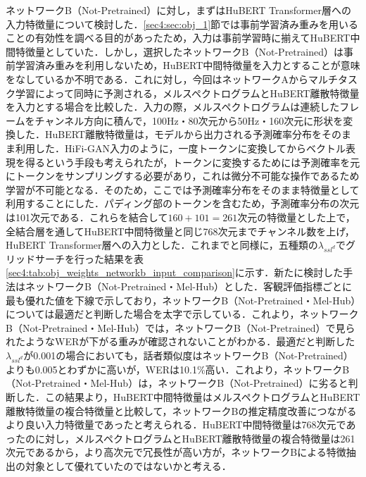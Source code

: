 \documentclass[12pt]{jarticle}
\numberwithin{equation}{section}    %
\numberwithin{figure}{section}      %
\numberwithin{table}{section}      %
\begin{document}
ネットワークB（Not-Pretrained）に対し，まずはHuBERT Transformer層への入力特徴量について検討した．\ref{sec4:sec:obj_1}節では事前学習済み重みを用いることの有効性を調べる目的があったため，入力は事前学習時に揃えてHuBERT中間特徴量としていた．しかし，選択したネットワークB（Not-Pretrained）は事前学習済み重みを利用しないため，HuBERT中間特徴量を入力とすることが意味をなしているか不明である．これに対し，今回はネットワークAからマルチタスク学習によって同時に予測される，メルスペクトログラムとHuBERT離散特徴量を入力とする場合を比較した．入力の際，メルスペクトログラムは連続したフレームをチャンネル方向に積んで，100Hz・80次元から50Hz・160次元に形状を変換した．HuBERT離散特徴量は，モデルから出力される予測確率分布をそのまま利用した．HiFi-GAN入力のように，一度トークンに変換してからベクトル表現を得るという手段も考えられたが，トークンに変換するためには予測確率を元にトークンをサンプリングする必要があり，これは微分不可能な操作であるため学習が不可能となる．そのため，ここでは予測確率分布をそのまま特徴量として利用することにした．パディング部のトークンを含むため，予測確率分布の次元は101次元である．これらを結合して$160 + 101 = 261$次元の特徴量とした上で，全結合層を通してHuBERT中間特徴量と同じ768次元までチャンネル数を上げ，HuBERT Transformer層への入力とした．これまでと同様に，五種類の$\lambda_{ssl^{d}}$でグリッドサーチを行った結果を表\ref{sec4:tab:obj_weights_networkb_input_comparison}に示す．新たに検討した手法はネットワークB（Not-Pretrained・Mel-Hub）とした．客観評価指標ごとに最も優れた値を下線で示しており，ネットワークB（Not-Pretrained・Mel-Hub）については最適だと判断した場合を太字で示している．これより，ネットワークB（Not-Pretrained・Mel-Hub）では，ネットワークB（Not-Pretrained）で見られたようなWERが下がる重みが確認されないことがわかる．最適だと判断した$\lambda_{ssl^{d}}$が0.001の場合においても，話者類似度はネットワークB（Not-Pretrained）よりも0.005とわずかに高いが，WERは10.1\%高い．これより，ネットワークB（Not-Pretrained・Mel-Hub）は，ネットワークB（Not-Pretrained）に劣ると判断した．この結果より，HuBERT中間特徴量はメルスペクトログラムとHuBERT離散特徴量の複合特徴量と比較して，ネットワークBの推定精度改善につながるより良い入力特徴量であったと考えられる．HuBERT中間特徴量は768次元であったのに対し，メルスペクトログラムとHuBERT離散特徴量の複合特徴量は261次元であるから，より高次元で冗長性が高い方が，ネットワークBによる特徴抽出の対象として優れていたのではないかと考える．
\end{document}
